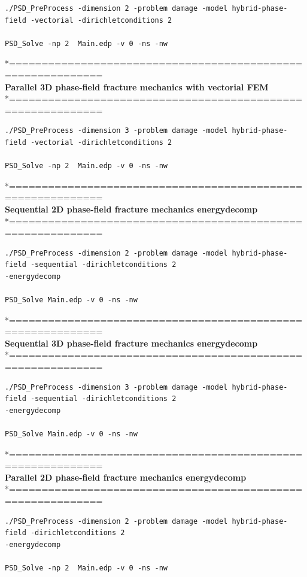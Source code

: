 \documentclass{report}
\begin{document}
\begin{lstlisting}[style=Linux]
./PSD_PreProcess -dimension 2 -problem damage -model hybrid-phase-field -vectorial -dirichletconditions 2   

PSD_Solve -np 2  Main.edp -v 0 -ns -nw   
\end{lstlisting}
*============================================================\\
\textbf{ Parallel 3D phase-field fracture mechanics  with vectorial FEM} \\
*============================================================\\
\begin{lstlisting}[style=Linux]
./PSD_PreProcess -dimension 3 -problem damage -model hybrid-phase-field -vectorial -dirichletconditions 2   

PSD_Solve -np 2  Main.edp -v 0 -ns -nw   
\end{lstlisting}
*============================================================\\
\textbf{ Sequential 2D  phase-field fracture mechanics energydecomp }\\
*============================================================\\
\begin{lstlisting}[style=Linux]
./PSD_PreProcess -dimension 2 -problem damage -model hybrid-phase-field -sequential -dirichletconditions 2 
-energydecomp   

PSD_Solve Main.edp -v 0 -ns -nw   
\end{lstlisting}
*============================================================\\
\textbf{ Sequential 3D phase-field fracture mechanics energydecomp }\\
*============================================================\\
\begin{lstlisting}[style=Linux]
./PSD_PreProcess -dimension 3 -problem damage -model hybrid-phase-field -sequential -dirichletconditions 2 
-energydecomp   

PSD_Solve Main.edp -v 0 -ns -nw   
\end{lstlisting}
*============================================================\\
\textbf{ Parallel 2D phase-field fracture mechanics energydecomp }\\
*============================================================\\
\begin{lstlisting}[style=Linux]
./PSD_PreProcess -dimension 2 -problem damage -model hybrid-phase-field -dirichletconditions 2 
-energydecomp   

PSD_Solve -np 2  Main.edp -v 0 -ns -nw   
\end{lstlisting}
\end{document}
